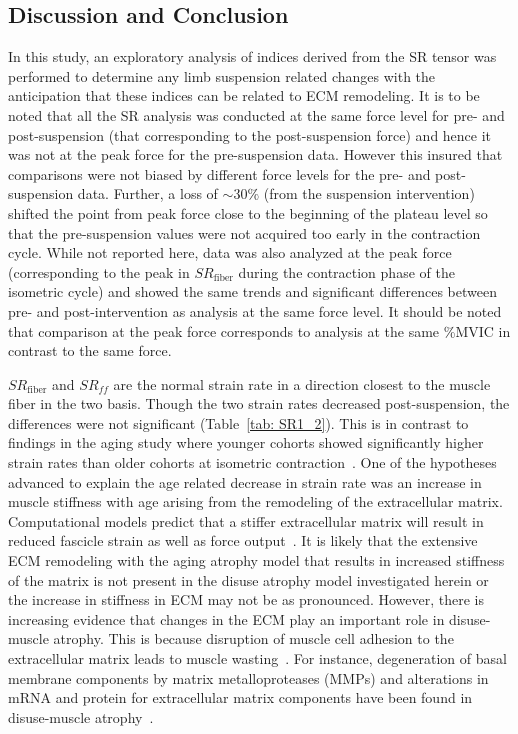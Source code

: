 \subsection{Discussion and Conclusion}
In this study, an exploratory analysis of indices derived from the SR tensor was performed to determine any limb suspension related changes with the anticipation that these indices can be related to ECM remodeling.
It is to be noted that all the SR analysis was conducted at the same force level for pre- and post-suspension (that corresponding to the post-suspension force) and hence it was not at the peak force for the pre-suspension data.
However this insured that comparisons were not biased by different force levels for the pre- and post-suspension data. 
Further, a loss of $\sim 30\%$ (from the suspension intervention) shifted the point from peak force close to the beginning of the plateau level so that the pre-suspension values were not acquired too early in the contraction cycle.
While not reported here, data was also analyzed at the peak force (corresponding to the peak in $SR_{\mathrm{fiber}}$ during the contraction phase of the isometric cycle) and showed the same trends and significant differences between pre- and post-intervention as analysis at the same force level. 
It should be noted that comparison at the peak force corresponds to analysis at the same \%MVIC in contrast to the same force. 

$SR_{\mathrm{fiber}}$ and $SR_{ff}$  are the normal strain rate in a direction closest to the muscle fiber in the two basis. 
Though the two strain rates decreased post-suspension, the differences were not significant (Table~\ref{tab: SR1_2}). 
This is in contrast to findings in the aging study where younger cohorts showed significantly higher strain rates than older cohorts at isometric contraction~\cite{RNS16}. 
One of the hypotheses advanced to explain the age related decrease in strain rate was an increase in muscle stiffness with age arising from the remodeling of the extracellular matrix. 
Computational models predict that a stiffer extracellular matrix will result in reduced fascicle strain as well as force output~\cite{RNS28}. 
It is likely that the extensive ECM remodeling with the aging atrophy model that results in increased stiffness of the matrix is not present in the disuse atrophy model investigated herein or the increase in stiffness in ECM may not be as pronounced. 
However, there is increasing evidence that changes in the ECM play an important role in disuse-muscle atrophy.
This is because disruption of muscle cell adhesion to the extracellular matrix leads to muscle wasting~\cite{RNS29, RNS30}.
 For instance, degeneration of basal membrane components by matrix metalloproteases (MMPs) and alterations in mRNA and protein for extracellular matrix components have been found in disuse-muscle atrophy~\cite{RNS29, RNS30}.

